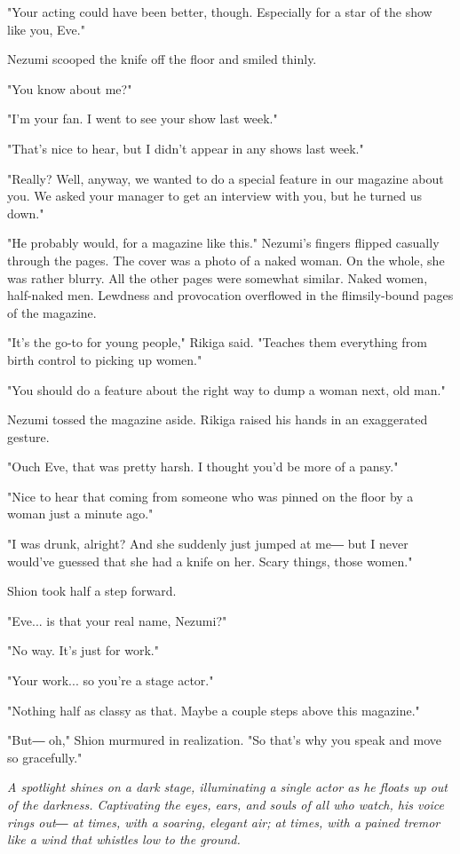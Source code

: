 "Your acting could have been better, though. Especially for a star of
the show like you, Eve."

Nezumi scooped the knife off the floor and smiled thinly.

"You know about me?"

"I'm your fan. I went to see your show last week."

"That's nice to hear, but I didn't appear in any shows last week."

"Really? Well, anyway, we wanted to do a special feature in our magazine
about you. We asked your manager to get an interview with you, but he
turned us down."

"He probably would, for a magazine like this." Nezumi's fingers flipped
casually through the pages. The cover was a photo of a naked woman. On
the whole, she was rather blurry. All the other pages were somewhat
similar. Naked women, half-naked men. Lewdness and provocation
overflowed in the flimsily-bound pages of the magazine.

"It's the go-to for young people," Rikiga said. "Teaches them everything
from birth control to picking up women."

"You should do a feature about the right way to dump a woman next, old
man."

Nezumi tossed the magazine aside. Rikiga raised his hands in an
exaggerated gesture.

"Ouch Eve, that was pretty harsh. I thought you'd be more of a pansy."

"Nice to hear that coming from someone who was pinned on the floor by a
woman just a minute ago."

"I was drunk, alright? And she suddenly just jumped at me― but I never
would've guessed that she had a knife on her. Scary things, those
women."

Shion took half a step forward.

"Eve... is that your real name, Nezumi?"

"No way. It's just for work."

"Your work... so you're a stage actor."

"Nothing half as classy as that. Maybe a couple steps above this
magazine."

"But― oh," Shion murmured in realization. "So that's why you speak and
move so gracefully."

\emph{A spotlight shines on a dark stage, illuminating a single actor as he
	floats up out of the darkness. Captivating the eyes, ears, and souls of
	all who watch, his voice rings out― at times, with a soaring, elegant
	air; at times, with a pained tremor like a wind that whistles low to the
	ground.}

